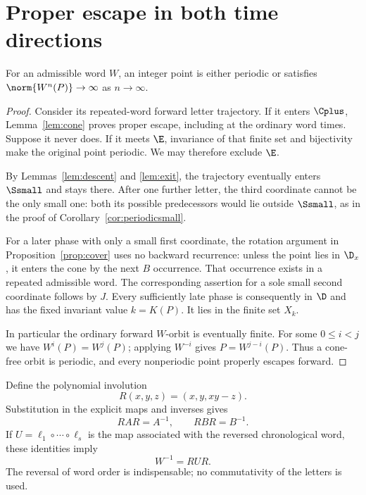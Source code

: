 \section{Proper escape in both time directions}\label{sec:twosided}

\begin{proposition}\label{prop:forward}
For an admissible word $W$, an integer point is either
periodic or satisfies $\norm{W^n(P)}\to\infty$ as
$n\to\infty$.
\end{proposition}

\begin{proof}
Consider its repeated-word forward letter trajectory.
If it enters $\Cplus$, Lemma~\ref{lem:cone} proves
proper escape, including at the ordinary word times.
Suppose it never does. If it meets $\E$, invariance of
that finite set and bijectivity make the original
point periodic. We may therefore exclude $\E$.

By Lemmas~\ref{lem:descent} and \ref{lem:exit}, the
trajectory eventually enters $\Ssmall$ and stays there.
After one further letter, the third coordinate cannot
be the only small one: both its possible predecessors
would lie outside $\Ssmall$, as in the proof of
Corollary~\ref{cor:periodicsmall}.

For a later phase with only a small first coordinate,
the rotation argument in Proposition~\ref{prop:cover}
uses no backward recurrence: unless the point lies in
$\D_x$, it enters the cone by the next $B$ occurrence.
That occurrence exists in a repeated admissible word.
The corresponding assertion for a sole small second
coordinate follows by $J$. Every sufficiently late
phase is consequently in $\D$ and has the fixed
invariant value $k=K(P)$. It lies in the finite set
$X_k$.

In particular the ordinary forward $W$-orbit is
eventually finite. For some $0\le i<j$ we have
$W^i(P)=W^j(P)$; applying $W^{-i}$ gives
$P=W^{j-i}(P)$. Thus a cone-free orbit is periodic,
and every nonperiodic point properly escapes forward.
\end{proof}

Define the polynomial involution
\begin{equation}\label{eq:reverser}
 R(x,y,z)=(x,y,xy-z).
\end{equation}
Substitution in the explicit maps and inverses gives
\[
 RAR=A^{-1},\qquad RBR=B^{-1}.
\]
If $U=\ell_1\circ\cdots\circ\ell_s$ is the map
associated with the reversed chronological word,
these identities imply
\begin{equation}\label{eq:inverseword}
 W^{-1}=RUR.
\end{equation}
The reversal of word order is indispensable; no
commutativity of the letters is used.

